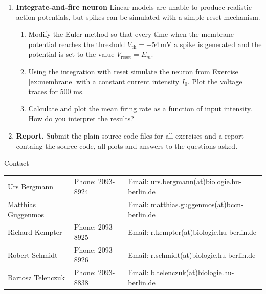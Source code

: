 \documentclass[12pt, a4]{article}
\begin{document}
\begin{enumerate}
    \item \textbf{Integrate-and-fire neuron}
        Linear models are unable to produce realistic action potentials, but
        spikes can be simulated with a simple reset mechanism.
        \begin{enumerate}

            \item Modify the Euler method so that every time when the membrane
            potential reaches the threshold $V_\mathrm{th}=-54\,\mathrm{mV}$ a
            spike is generated and the potential is set to the value
            $V_\mathrm{reset}=E_m$. 

            \item Using the integration with reset simulate the neuron from
            Exercise \ref{ex:membrane} with a constant current intensity
            $I_0$. Plot the voltage traces for 500 ms.

            \item Calculate and plot the mean firing rate as a function of
            input intensity. How do you interpret the results?
        \end{enumerate}

    \item {\bf Report.} Submit the plain source code files for all exercises
        and a report containg the source code, all plots and answers to the
        questions asked.
\end{enumerate}

\vfill
\centerline{\CAP Contact}
\CAP

\begin{tabular}{lll}
Urs Bergmann & Phone: 2093-8924 & Email:
urs.bergmann(at)biologie.hu-berlin.de \\
Matthias Guggenmos & & Email: matthias.guggenmos(at)bccn-berlin.de \\
Richard Kempter \hfill & Phone: 2093-8925 \hfill & Email:
r.kempter(at)biologie.hu-berlin.de \\
Robert Schmidt & Phone: 2093-8926 & Email: r.schmidt(at)biologie.hu-berlin.de
\\
Bartosz Telenczuk & Phone: 2093-8838 & Email:
b.telenczuk(at)biologie.hu-berlin.de \\
\end{tabular}
\end{document}
